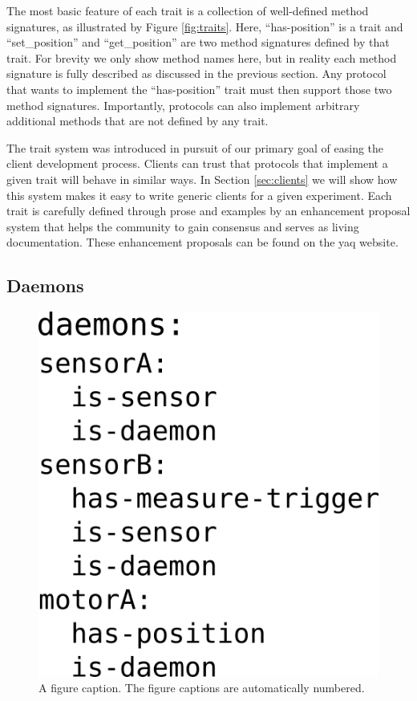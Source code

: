 \documentclass[aip, amsmath, amssymb, reprint,]{revtex4-1}
\begin{document}
The most basic feature of each trait is a collection of well-defined method signatures, as illustrated by Figure \ref{fig:traits}.
Here, ``has-position'' is a trait and ``set\_position'' and ``get\_position'' are two method signatures defined by that trait.
For brevity we only show method names here, but in reality each method signature is fully described as discussed in the previous section.
Any protocol that wants to implement the ``has-position'' trait must then support those two method signatures.
Importantly, protocols can also implement arbitrary additional methods that are not defined by any trait.

The trait system was introduced in pursuit of our primary goal of easing the client development process.
Clients can trust that protocols that implement a given trait will behave in similar ways.
In Section \ref{sec:clients} we will show how this system makes it easy to write generic clients for a given experiment.
Each trait is carefully defined through prose and examples by an enhancement proposal system that helps the community to gain consensus and serves as living documentation.
These enhancement proposals can be found on the yaq website.

\subsection{Daemons}

\begin{figure}
  \label{fig:daemons}
  \includegraphics[width=\columnwidth]{./figures/daemons.png}
  \caption{ A figure caption. The figure captions are automatically numbered.}
\end{figure}
\end{document}
